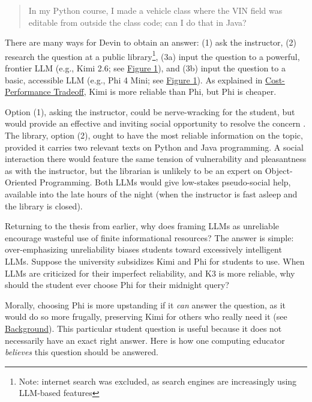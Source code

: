 \begin{quote}
In my Python course, I made a vehicle class where the VIN field was editable from outside the class code; can I do that in Java?
\end{quote}

There are many ways for Devin to obtain an answer: (1) ask the instructor, (2) research the question at a public library\footnote{Note: internet search was excluded, as search engines are increasingly using LLM-based features}, (3a) input the question to a powerful, frontier LLM (e.g., Kimi 2.6; see \hyperref[_Ref236385853]{Figure 1}), and (3b) input the question to a basic, accessible LLM (e.g., Phi 4 Mini; see \hyperref[_Ref236385853]{Figure 1}). As explained in \hyperref[cost-performance-tradeoff]{Cost-Performance Tradeoff}, Kimi is more reliable than Phi, but Phi is cheaper.

Option (1), asking the instructor, could be nerve-wracking for the student, but would provide an effective and inviting social opportunity to resolve the concern \cite{fanImpactAIassistedPair2025,gardellaHBCUStudentPerspectives2025}. The library, option (2), ought to have the most reliable information on the topic, provided it carries two relevant texts on Python and Java programming. A social interaction there would feature the same tension of vulnerability and pleasantness as with the instructor, but the librarian is unlikely to be an expert on Object-Oriented Programming. Both LLMs would give low-stakes pseudo-social help, available into the late hours of the night (when the instructor is fast asleep and the library is closed).

Returning to the thesis from earlier, why does framing LLMs as unreliable encourage wasteful use of finite informational resources? The answer is simple: over-emphasizing unreliability biases students toward excessively intelligent LLMs. Suppose the university subsidizes Kimi and Phi for students to use. When LLMs are criticized for their imperfect reliability, and K3 is more reliable, why should the student ever choose Phi for their midnight query?

Morally, choosing Phi is more upstanding if it \emph{can} answer the question, as it would do so more frugally, preserving Kimi for others who really need it (see \hyperref[background]{Background}). This particular student question is useful because it does not necessarily have an exact right answer. Here is how one computing educator \emph{believes} this question should be answered.


